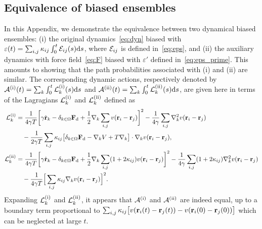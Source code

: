 \documentclass[pre, superscriptaddress, twocolumn,pre]{revtex4-1}
\begin{document}
\begin{widetext}
\section{Equivalence of biased ensembles}\label{sec:far}

In this Appendix, we demonstrate the equivalence between two dynamical biased ensembles: (i) the original dynamics~\eqref{eq:dyn} biased with $\varepsilon(t)=\sum_{i,j} \kappa_{ij}\int_0^t{\cal E}_{ij}(s){\rm d}s$, where ${\cal E}_{ij}$ is defined in~\eqref{eq:eps}, and (ii) the auxiliary dynamics with force field~\eqref{eq:F} biased with $\varepsilon'$ defined in~\eqref{eq:eps_prime}. This amounts to showing that the path probabilities associated with (i) and (ii) are similar. The corresponding dynamic actions, respectively denoted by ${\cal A}^{(\rm i)}(t)=\sum_k\int_0^t{\cal L}_k^{(\rm i)}(s){\rm d}s$ and ${\cal A}^{(\rm ii)}(t)=\sum_k\int_0^t{\cal L}_k^{(\rm ii)}(s){\rm d}s$, are given here in terms of the Lagragians ${\cal L}_k^{(\rm i)}$ and ${\cal L}_k^{(\rm ii)}$ defined as
\begin{equation}\label{eq:lag}
	\begin{aligned}
		{\cal L}_k^{(\rm i)} &= \frac{1}{4\gamma T} \bigg[\gamma\dot{\bf r}_k - \delta_{k\in\Omega}{\bf F}_{\rm d} + \frac{1}{2}\nabla_k\sum_{i,j}v({\bf r}_i-{\bf r}_j)\bigg]^2 - \frac{1}{4\gamma} \sum_{i,j}\nabla^2_kv({\bf r}_i-{\bf r}_j)
		\\
		&\quad - \frac{1}{2\gamma T} \sum_{i,j}\kappa_{ij}\big[\delta_{k\in\Omega}{\bf F}_{\rm d} - \nabla_k V + T \nabla_k\big] \cdot\nabla_k v({\bf r}_i-{\bf r}_j) ,
		\\
		{\cal L}_k^{(\rm ii)}	&= \frac{1}{4\gamma T} \bigg[\gamma\dot{\bf r}_k - \delta_{k\in\Omega}{\bf F}_{\rm d} + \frac{1}{2}\nabla_k\sum_{i,j}(1+2\kappa_{ij})v({\bf r}_i-{\bf r}_j)\bigg]^2 - \frac{1}{4\gamma} \sum_{i,j}(1+2\kappa_{ij})\nabla^2_kv({\bf r}_i-{\bf r}_j)
		\\
		&\quad - \frac{1}{4\gamma T}\Big[\sum_{i,j}\kappa_{ij}\nabla_kv({\bf r}_i-{\bf r}_j)\Big]^2 .
	\end{aligned}
\end{equation}
Expanding ${\cal L}_k^{(\rm i)}$ and ${\cal L}_k^{(\rm ii)}$, it appears that ${\cal A}^{(\rm i)}$ and  ${\cal A}^{(\rm ii)}$ are indeed equal, up to a boundary term proportional to $\sum_{i,j}\kappa_{ij}\big[v({\bf r}_i(t)-{\bf r}_j(t)) - v({\bf r}_i(0)-{\bf r}_j(0))\big]$ which can be neglected at large $t$.
\end{widetext}






\end{document}
